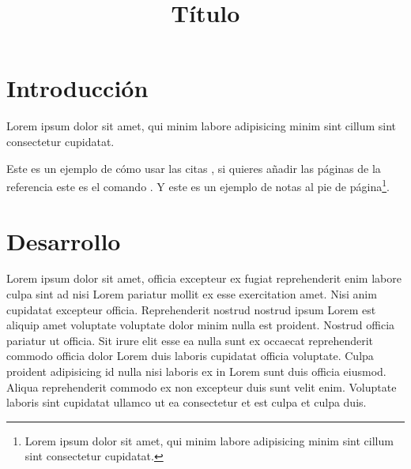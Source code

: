 \documentclass[doc,12pt]{apa7}
\begin{document}

\title{Título}






\maketitle %


\section{Introducción}

Lorem ipsum dolor sit amet, qui minim labore adipisicing minim sint cillum sint consectetur cupidatat.

Este es un ejemplo de cómo usar las citas
\parencite{Sartlp}, si quieres añadir las páginas de la
referencia este es el comando \parencite[50-60]{parmh}. Y
este es un ejemplo de notas al pie de página\footnote{Lorem
	ipsum dolor sit amet, qui minim labore adipisicing minim
	sint cillum sint consectetur cupidatat.}.


\section{Desarrollo}

Lorem ipsum dolor sit amet, officia excepteur ex fugiat reprehenderit enim labore culpa sint ad nisi Lorem pariatur mollit ex esse exercitation amet. Nisi anim cupidatat excepteur officia. Reprehenderit nostrud nostrud ipsum Lorem est aliquip amet voluptate voluptate dolor minim nulla est proident. Nostrud officia pariatur ut officia. Sit irure elit esse ea nulla sunt ex occaecat reprehenderit commodo officia dolor Lorem duis laboris cupidatat officia voluptate. Culpa proident adipisicing id nulla nisi laboris ex in Lorem sunt duis officia eiusmod. Aliqua reprehenderit commodo ex non excepteur duis sunt velit enim. Voluptate laboris sint cupidatat ullamco ut ea consectetur et est culpa et culpa duis.
\end{document}

